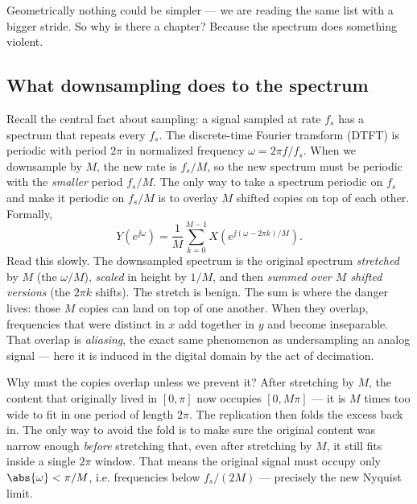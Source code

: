 Geometrically nothing could be simpler --- we are reading the same list with a
bigger stride. So why is there a chapter? Because the spectrum does something
violent.

\subsection{What downsampling does to the spectrum}

Recall the central fact about sampling: a signal sampled at rate $f_s$ has a
spectrum that repeats every $f_s$. The discrete-time Fourier transform (DTFT)
is periodic with period $2\pi$ in normalized frequency $\omega = 2\pi f/f_s$.
When we downsample by $M$, the new rate is $f_s/M$, so the new spectrum must be
periodic with the \emph{smaller} period $f_s/M$. The only way to take a
spectrum periodic on $f_s$ and make it periodic on $f_s/M$ is to overlay $M$
shifted copies on top of each other. Formally,
\begin{equation}
  Y(e^{\jj\omega}) = \frac{1}{M}\sum_{k=0}^{M-1}
    X\!\left(e^{\jj(\omega - 2\pi k)/M}\right).
  \label{ch22:downspec}
\end{equation}
Read this slowly. The downsampled spectrum is the original spectrum
\emph{stretched} by $M$ (the $\omega/M$), \emph{scaled} in height by $1/M$, and
then \emph{summed over $M$ shifted versions} (the $2\pi k$ shifts). The stretch
is benign. The sum is where the danger lives: those $M$ copies can land on top
of one another. When they overlap, frequencies that were distinct in $x$ add
together in $y$ and become inseparable. That overlap is \emph{aliasing}, the
exact same phenomenon as undersampling an analog signal --- here it is induced
in the digital domain by the act of decimation.

\begin{whybox}
Why must the copies overlap unless we prevent it? After stretching by $M$, the
content that originally lived in $[0, \pi]$ now occupies $[0, M\pi]$ --- it is
$M$ times too wide to fit in one period of length $2\pi$. The replication then
folds the excess back in. The only way to avoid the fold is to make sure the
original content was narrow enough \emph{before} stretching that, even after
stretching by $M$, it still fits inside a single $2\pi$ window. That means the
original signal must occupy only $\abs{\omega} < \pi/M$, i.e. frequencies below
$f_s/(2M)$ --- precisely the new Nyquist limit.
\end{whybox}

